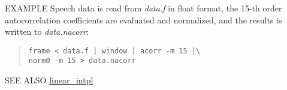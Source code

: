 \begin{options}
\end{options}

\begin{qsection}{EXAMPLE}
Speech data is read from {\em data.f} in float format,
the 15-th order autocorrelation coefficients are evaluated
and normalized, and the results is written to {\em data.nacorr}:
\begin{quote}
  \verb!frame < data.f | window | acorr -m 15 |\ !\\
  \verb!norm0 -m 15 > data.nacorr!
\end{quote}
\end{qsection}

\begin{qsection}{SEE ALSO}
\hyperlink{linear_intpl}{linear\_intpl}
\end{qsection}
